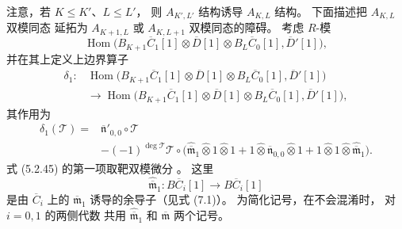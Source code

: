 注意，若 $K\leq K'$、$L\leq L'$，
则 $A_{K',L'}$ 结构诱导 $A_{K,L}$ 结构。
下面描述把 $A_{K,L}$ 双模同态
延拓为 $A_{K+1,L}$ 或
$A_{K,L+1}$ 双模同态的障碍。
考虑 $R$-模
\[
\operatorname{Hom}\bigl(
B_{K+1}\overline C_1[1]
\otimes\overline D[1]
\otimes B_L\overline C_0[1],
\overline D'[1]\bigr),
\]
并在其上定义上边界算子
\[
\begin{aligned}
\delta_1:
&\operatorname{Hom}\bigl(
B_{K+1}\overline C_1[1]
\otimes\overline D[1]
\otimes B_L\overline C_0[1],
\overline D'[1]\bigr)\\
&\longrightarrow
\operatorname{Hom}\bigl(
B_{K+1}\overline C_1[1]
\otimes\overline D[1]
\otimes B_L\overline C_0[1],
\overline D'[1]\bigr),
\end{aligned}
\]
其作用为
\begin{equation}
\begin{aligned}
\delta_1(\mathcal T)
={}&\overline{\mathfrak n}'_{0,0}
\circ\mathcal T\\
&-(-1)^{\deg\mathcal T}
\mathcal T\circ\bigl(
\widehat{\overline{\mathfrak m}}_1
  \widehat\otimes 1\widehat\otimes1
+1\widehat\otimes
  \overline{\mathfrak n}_{0,0}
  \widehat\otimes1
+1\widehat\otimes1
  \widehat\otimes
  \widehat{\overline{\mathfrak m}}_1
\bigr).
\end{aligned}
\tag{5.2.45}\label{eq:5-2-45}
\end{equation}
式 (5.2.45) 的第一项取靶双模微分
。
这里
\[
\widehat{\overline{\mathfrak m}}_1:
B\overline C_i[1]
\longrightarrow
B\overline C_i[1]
\]
是由 $\overline C_i$ 上的
$\overline{\mathfrak m}_1$
诱导的余导子（见式 (7.1)）。
为简化记号，在不会混淆时，
对 $i=0,1$ 的两侧代数
共用
$\widehat{\overline{\mathfrak m}}_1$
和 $\overline{\mathfrak m}$ 两个记号。

